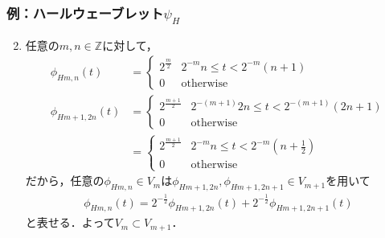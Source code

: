 \documentclass[dvipdfmx,graphicx,14pt]{beamer}
\begin{document}
\begin{frame}[c]
    \frametitle{例：ハールウェーブレット$\psi_{H}$}
    \begin{enumerate}[(M1)]
        \setcounter{enumi}{1}
        \item 任意の$m,n \in \mathbb{Z}$に対して，
            \small
            \begin{align*}
                \phi_{H m,n}(t) &= 
                \left\{
                    \begin{array}{cc}
                        2^{\frac{m}{2}} & 2^{-m}n \leq t < 2^{-m}(n+1) \\
                        0  & \text{otherwise}
                    \end{array}
                    \right. \\
                \phi_{H m+1,2n}(t) &= 
                \left\{
                    \begin{array}{cc}
                        2^{\frac{m+1}{2}} & 2^{-(m+1)} 2n \leq t < 2^{-(m+1)}(2n+1) \\
                        0  & \text{otherwise}
                    \end{array}
                    \right. \\
                    &= \left\{
                    \begin{array}{cc}
                        2^{\frac{m+1}{2}} & 2^{-m} n \leq t < 2^{-m}(n+\frac{1}{2}) \\
                        0  & \text{otherwise}
                    \end{array}
                    \right. 
            \end{align*}
            \normalsize
            だから，任意の$\phi_{H m,n} \in V_{m}$は$\phi_{H m+1,2n}, \phi_{H m+1,2n+1} \in V_{m+1}$を用いて
            \small
            \begin{align}
                \phi_{H m,n}(t) = 2^{-\frac{1}{2}} \phi_{H m+1,2n}(t) + 2^{-\frac{1}{2}} \phi_{H m+1,2n+1}(t) \label{eq:haar_dilation_eq}
            \end{align}
            \normalsize
            と表せる．よって$V_{m} \subset V_{m+1}$．
    \end{enumerate}
\end{frame}
\end{document}
